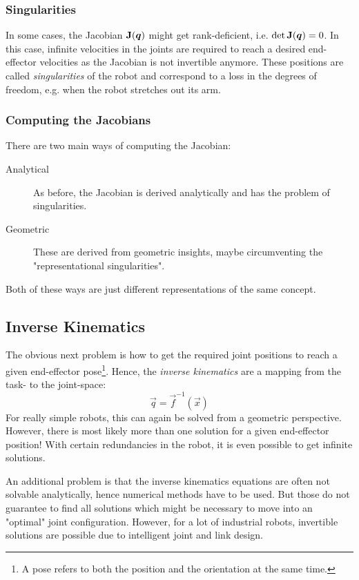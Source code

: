 			\subsubsection{Singularities}
				In some cases, the Jacobian \( \bm{\mathrm{J}}(\bm{q}) \) might get rank-deficient, i.e. \( \det \bm{\mathrm{J}}(\bm{q}) = 0 \). In this case, infinite velocities in the joints are required to reach a desired end-effector velocities as the Jacobian is not invertible anymore. These positions are called \emph{singularities} of the robot and correspond to a loss in the degrees of freedom, e.g. when the robot stretches out its arm.

			\subsubsection{Computing the Jacobians}
				There are two main ways of computing the Jacobian:
				\begin{description}
					\item[Analytical] As before, the Jacobian is derived analytically and has the problem of singularities.
					\item[Geometric]  These are derived from geometric insights, maybe circumventing the "representational singularities".
				\end{description}
				Both of these ways are just different representations of the same concept.

		\subsection{Inverse Kinematics}
			\label{subsec:inverseKinematics}

			The obvious next problem is how to get the required joint positions to reach a given end-effector pose\footnote{A pose refers to both the position and the orientation at the same time.}. Hence, the \emph{inverse kinematics} are a mapping from the task- to the joint-space:
			\begin{equation*}
				\vec{q} = \vec{f}^{-1}(\vec{x})
			\end{equation*}
			For really simple robots, this can again be solved from a geometric perspective. However, there is most likely more than one solution for a given end-effector position! With certain redundancies in the robot, it is even possible to get infinite solutions.

			An additional problem is that the inverse kinematics equations are often not solvable analytically, hence numerical methods have to be used. But those do not guarantee to find all solutions which might be necessary to move into an "optimal" joint configuration. However, for a lot of industrial robots, invertible solutions are possible due to intelligent joint and link design.

